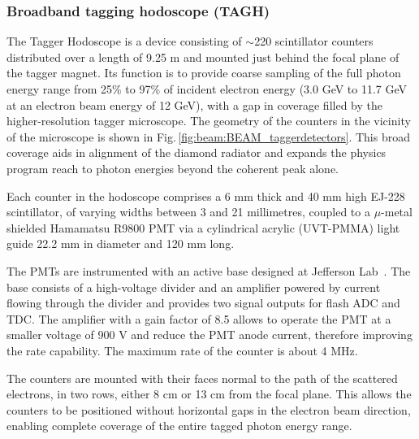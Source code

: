 \subsubsection{Broadband tagging hodoscope (TAGH)}\label{sec:TAGHIntro}
The Tagger Hodoscope is a device consisting of $\sim$220 scintillator counters distributed over a length of 9.25 m and mounted just behind the focal plane of the tagger magnet.
Its function is to provide coarse sampling of the full photon energy range from 25\% to 97\% of incident electron energy (3.0 GeV to 11.7 GeV at an electron beam energy of 12 GeV), with a gap in coverage filled by the higher-resolution tagger microscope. The geometry of the counters in the vicinity of the microscope is shown in Fig.\,\ref{fig:beam:BEAM_taggerdetectors}. 
This broad coverage aids in alignment of the diamond radiator and expands the \GX{} physics program reach to photon energies beyond the coherent peak alone.

Each counter in the hodoscope comprises a 6 mm thick and 40 mm high EJ-228 scintillator, of varying widths between 3 and 21 millimetres, coupled to a $\mu$-metal shielded Hamamatsu R9800 PMT via a cylindrical acrylic (UVT-PMMA) light guide 22.2 mm in diameter and 120 mm long.

The PMTs are instrumented with an active base designed at Jefferson Lab~\cite{tagh:base}. The base consists of a high-voltage divider and an amplifier powered by current flowing through the divider and provides two signal outputs for flash ADC and TDC.
The amplifier with a gain factor of 8.5 allows to operate the PMT at  a smaller voltage of 900 V and reduce the PMT anode current, therefore improving the rate capability. The maximum rate of the counter is about 4 MHz.

The counters are mounted with their faces normal to the path of the scattered electrons, in two rows, either 8 cm or 13 cm from the focal plane.
This allows the counters to be positioned without horizontal gaps in the electron beam direction, enabling complete coverage of the entire tagged photon energy range.

